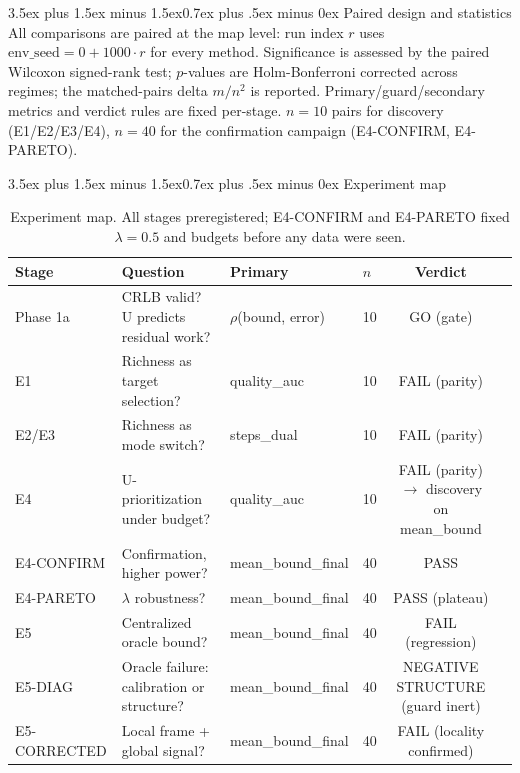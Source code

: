 \documentclass[journal]{IEEEtran}
\makeatletter
\renewcommand{\subsection}{\@startsection{subsection}{2}{\z@}%
{3.5ex plus 1.5ex minus 1.5ex}{0.7ex plus .5ex minus 0ex}%
{\normalfont\normalsize\bfseries}}
\makeatother
\begin{document}
\subsection{Paired design and statistics}
All comparisons are paired at the map level: run index $r$ uses
$\mathrm{env\_seed} = 0 + 1000 \cdot r$ for every method. Significance is
assessed by the paired Wilcoxon signed-rank test; $p$-values are
Holm-Bonferroni corrected across regimes; the matched-pairs delta $m/n^2$ is
reported. Primary/guard/secondary metrics and verdict rules are fixed
per-stage. $n = 10$ pairs for discovery (E1/E2/E3/E4), $n = 40$ for the
confirmation campaign (E4-CONFIRM, E4-PARETO).

\subsection{Experiment map}

\begin{table}[t]
\caption{Experiment map. All stages preregistered; E4-CONFIRM and E4-PARETO fixed $\lambda = 0.5$ and budgets before any data were seen.}
\label{tab:map}
\centering
\begin{tabular}{l l l l c l}
\toprule
Stage & Question & Primary & $n$ & Verdict \\
\midrule
Phase 1a & CRLB valid? U predicts residual work? & $\rho$(bound, error) & 10 & GO (gate) \\
E1 & Richness as target selection? & quality\_auc & 10 & FAIL (parity) \\
E2/E3 & Richness as mode switch? & steps\_dual & 10 & FAIL (parity) \\
E4 & U-prioritization under budget? & quality\_auc & 10 & FAIL (parity) $\rightarrow$ discovery on mean\_bound \\
E4-CONFIRM & Confirmation, higher power? & mean\_bound\_final & 40 & PASS \\
E4-PARETO & $\lambda$ robustness? & mean\_bound\_final & 40 & PASS (plateau) \\
E5 & Centralized oracle bound? & mean\_bound\_final & 40 & FAIL (regression) \\
E5-DIAG & Oracle failure: calibration or structure? & mean\_bound\_final & 40 & NEGATIVE STRUCTURE (guard inert) \\
E5-CORRECTED & Local frame + global signal? & mean\_bound\_final & 40 & FAIL (locality confirmed) \\
\bottomrule
\end{tabular}
\end{table}
\end{document}
